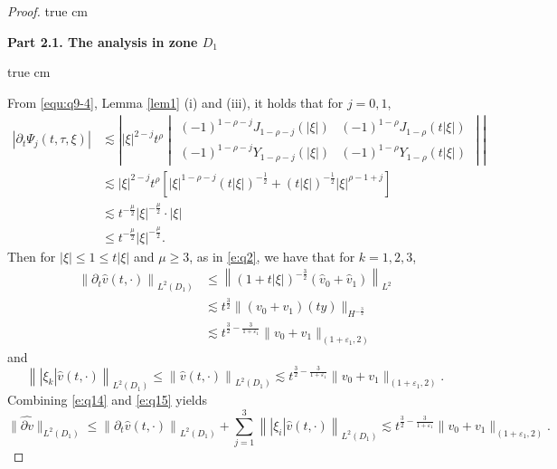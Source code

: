 \documentclass[11pt,twoside]{article}
\newcommand{\p}{\partial}
\newcommand{\f}{\frac}
\theoremstyle{plain}
\theoremstyle{definition}
\theoremstyle{remark}
\numberwithin{equation}{section}
\begin{document}
\begin{proof}
 true cm

{\bf Part 2.1.  The analysis  in zone $D_1$}

 true cm

From \eqref{equ:q9-4}, Lemma \ref{lem1} (i) and (iii), it holds that for $j=0,1$,
\begin{equation}\label{e:q13}
\begin{aligned}
|\p_t\Psi_j(t,\tau,\xi)|
&\lesssim\left| |\xi|^{2-j} t^{\rho}
\begin{vmatrix}
(-1)^{1-\rho-j}J_{1-\rho-j}(|\xi|) & (-1)^{1-\rho}J_{1-\rho}(t|\xi|) \\
(-1)^{1-\rho-j}Y_{1-\rho-j}(|\xi|) & (-1)^{1-\rho}Y_{1-\rho}(t|\xi|)
\end{vmatrix} \right|\\
&\lesssim |\xi|^{2-j} t^{\rho}\left[|\xi|^{1-\rho-j}(t|\xi|)^{-\f12}+(t|\xi|)^{-\f12}|\xi|^{\rho-1+j}\right]\\
&\lesssim t^{-\f{\mu}{2}}|\xi|^{-\f{\mu}{2}}\cdot|\xi|\\
&\leq t^{-\f{\mu}{2}}|\xi|^{-\f{\mu}{2}}.
\end{aligned}
\end{equation}
Then for $|\xi| \leq 1\leq t|\xi|$ and $\mu\geq3$, as in \eqref{e:q2}, we have that for $k=1, 2, 3$,
\begin{equation}\label{e:q14}
\begin{aligned}
\left\|\p_t\hat{v}(t, \cdot)\right\|_{L^2(D_1)} & \leq\left\|(1+t|\xi|)^{-\f32}(\hat{v}_{0}+\hat{v}_{1})\right\|_{L^{2}} \\
& \lesssim t^{\f32}\|(v_0+v_1)(ty)\|_{H^{-\f32}}\\
& \lesssim t^{\f32-\f{3}{1+\varepsilon_1}}\|v_0+v_1\|_{(1+\varepsilon_1, 2)}
\end{aligned}
\end{equation}
and
\begin{equation}\label{e:q15}
\left\||\xi_k|\hat{v}(t, \cdot)\right\|_{L^2(D_1)}\leq\left\|\hat{v}(t, \cdot)\right\|_{L^2(D_1)}
\lesssim  t^{\f32-\f{3}{1+\varepsilon_1}}\|v_0+v_1\|_{(1+\varepsilon_1, 2)}.
\end{equation}
Combining  \eqref{e:q14} and \eqref{e:q15} yields
\begin{equation}\label{e:q16}
\|\widehat{\p v}\|_{L^2(D_1)}\leq \left\|\p_t\hat{v}(t, \cdot)\right\|_{L^2(D_1)}+\sum_{j=1}^{3}\left\||\xi_i|\hat{v}(t, \cdot)\right\|_{L^2(D_1)} \lesssim t^{\f32-\f{3}{1+\varepsilon_1}}\|v_0+v_1\|_{(1+\varepsilon_1, 2)}.
\end{equation}


\end{proof}
\end{document}
